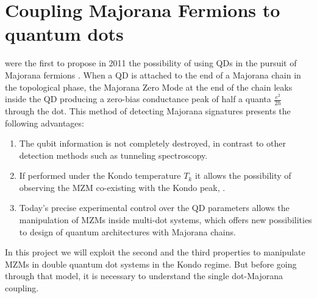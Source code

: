











\section{Coupling Majorana Fermions to quantum dots \label{sec:QD-Majorana}}
\citeauthor{liu_detecting_2011} were the first to propose in 2011 the possibility of using QDs in the pursuit of Majorana fermions . When a QD is attached to the end of a Majorana chain in the topological phase,  the Majorana Zero Mode at the end of the chain leaks inside the QD \cite{vernek_subtle_2014} producing a zero-bias conductance peak of half a quanta $\frac{e^{2}}{2h}$ through the dot.  This method of detecting Majorana signatures presents the following  advantages:

\begin{enumerate}
  \item The qubit information  is not completely destroyed, in contrast to other detection methods such as tunneling spectroscopy.
  \item If performed under the  Kondo temperature $T_k$ it allows the possibility of observing the  MZM co-existing with the Kondo peak, \cite{lee_kondo_2013,ruiz-tijerina_interaction_2015,gorski_interplay_2018} .
  \item Today's precise experimental control over the QD parameters allows the manipulation of MZMs inside multi-dot systems, which offers new possibilities to design of quantum architectures with Majorana chains.\cite{barkeshli_physical_2015,karzig_scalable_2017} 
\end{enumerate}

In this project we will exploit the second and the third properties to manipulate MZMs in double quantum dot systems in the Kondo regime. But before going through that model, it is necessary to understand the single dot-Majorana coupling.

